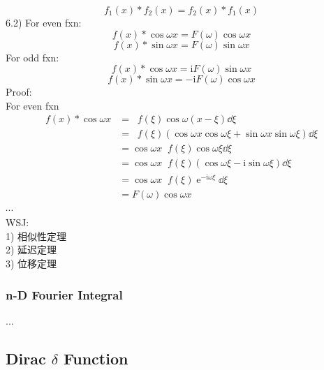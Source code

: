 \documentclass[UTF8]{ctexart} %
\DeclareMathOperator{\intdinf}{\int_{-\infty}^\infty}
\DeclareMathOperator{\e}{\mathrm{e}}
\renewcommand{\I}{\mathrm{i}}
\numberwithin{equation}{section}
\begin{document}
\begin{equation}\label{key}
f_1(x)*f_2(x)=f_2(x)*f_1(x)
\end{equation}
6.2) For even fxn:
\begin{equation}\label{key}
f(x)*\cos\omega x = F(\omega)\cos\omega x
\end{equation}
\begin{equation}\label{key}
f(x)*\sin\omega x = F(\omega)\sin\omega x
\end{equation}
For odd fxn:
\begin{equation}\label{key}
f(x)*\cos\omega x = \I F(\omega)\sin\omega x
\end{equation}
\begin{equation}\label{key}
f(x)*\sin\omega x = -\I F(\omega)\cos\omega x
\end{equation}
Proof:\\
For even fxn
\begin{equation}\label{key}
\begin{aligned}
f(x)*\cos\omega x &= \intdinf f(\xi)\cos\omega(x-\xi)\dd\xi\\
&=\intdinf f(\xi)\left(\cos\omega x\cos\omega\xi+\sin\omega x\sin\omega\xi\right)\dd\xi\\
&=\cos\omega x\intdinf f(\xi)\cos\omega\xi\dd\xi\\
&=\cos\omega x\intdinf f(\xi)\left(\cos\omega\xi-\I\sin\omega\xi\right)\dd\xi\\
&=\cos\omega x\intdinf f(\xi)\e^{-\I\omega\xi}\dd\xi\\
&=F(\omega)\cos\omega x
\end{aligned}
\end{equation}
$\cdots$\\

WSJ:\\
1) 相似性定理\\
2) 延迟定理\\
3) 位移定理\\

\subsubsection{n-D Fourier Integral}
...\\

\subsection{Dirac $\delta$ Function}
\end{document}
